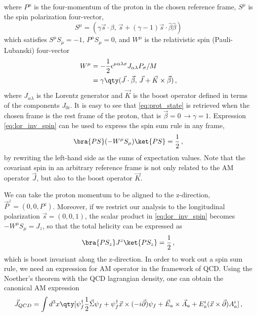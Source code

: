 where $P^{\mu}$ is the four-momentum of the proton in the chosen reference frame, $S^{\mu}$ is the spin polarization four-vector,
\begin{equation}
    S^{\mu} = (\gamma \vec{s} \cdot \beta, \, \vec{s} + (\gamma - 1) \vec{s} \cdot \hat{\beta} \hat{\beta})
\end{equation}
which satisfies $S^{\mu} S_{\mu} = -1$, $P^{\mu} S_{\mu} = 0$, and $W^{\mu}$ is the relativistic spin (Pauli-Lubanski) four-vector 
\begin{equation}
    \begin{split}
        W^{\mu} & = -\frac{1}{2} \epsilon^{\mu \alpha \lambda \sigma} J_{\alpha \lambda} P_{\sigma}/M \\
        & = \gamma \qty( \vec{J} \cdot \vec{\beta}, \, \vec{J} + \vec{K} \times \vec{\beta} )\,,
    \end{split}
\end{equation}
where $J_{\alpha \lambda}$ is the Lorentz generator and $\vec{K}$ is the boost operator defined in terms of the components $J_{0i}$. It is easy to see that \eqref{eq:prot_state} is retrieved when the chosen frame is the rest frame of the proton, that is $\vec{\beta} = 0 \, \rightarrow \gamma = 1$. Expression \eqref{eq:lor_inv_spin} can be used to express the spin sum rule in any frame, 
\begin{equation}
    \bra{PS} (- W^{\mu}S_{\mu}) \ket{PS}  = \frac{1}{2} \,,
\end{equation}
by rewriting the left-hand side as the sums of expectation values. Note that the covariant spin in an arbitrary reference frame is not only related to the AM operator $\vec{J}$, but also to the boost operator $\vec{K}$.\par
We can take the proton momentum to be aligned to the z-direction, $\vec{P}^{z} = (0,0,P^{z})$. Moreover, if we restrict our analysis to the longitudinal polarization $\vec{s} = (0,0,1)$, the scalar product in \eqref{eq:lor_inv_spin} becomes $-W^{\mu} S_{\mu} = J_{z}$, so that the total helicity can be expressed as
\begin{equation}
    \bra{P S_z} J^{z} \ket{P S_z} = \frac{1}{2} \,,
\end{equation} 
which is boost invariant along the z-direction. In order to work out a spin sum rule, we need an expression for AM operator in the framework of QCD. Using the Noether's theorem with the QCD lagrangian density, one can obtain the canonical AM expression 
\begin{equation}
    \vec{J}_{QCD} = \int d^3 x \qty [ \psi^{\dag}_{f} \frac{1}{2} \vec{\Sigma} \psi_{f} +  \psi^{\dag}_{f} \vec{x} \times (-i \vec{\partial}) \psi_{f} + \vec{E}_{a} \times \vec{A}_{a} + E^{i}_{a} (\vec{x} \times \vec{\partial}) A_{a}^i] \,,
    \label{eq:can_spin_dec_qft}
\end{equation}
